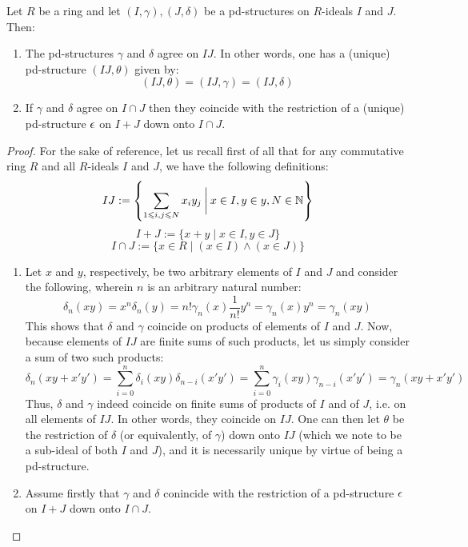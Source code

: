                 \begin{proposition}
                    Let $R$ be a ring and let $(I, \gamma), (J, \delta)$ be a pd-structures on $R$-ideals $I$ and $J$. Then:
                        \begin{enumerate}
                            \item The pd-structures $\gamma$ and $\delta$ agree on $IJ$. In other words, one has a (unique) pd-structure $(IJ, \theta)$ given by:
                                $$(IJ, \theta) = (IJ, \gamma) = (IJ, \delta)$$
                            \item If $\gamma$ and $\delta$ agree on $I \cap J$ then they coincide with the restriction of a (unique) pd-structure $\epsilon$ on $I + J$ down onto $I \cap J$.
                        \end{enumerate}
                \end{proposition}
                    \begin{proof}
                        For the sake of reference, let us recall first of all that for any commutative ring $R$ and all $R$-ideals $I$ and $J$, we have the following definitions:
                            $$IJ := \left\{\sum_{1 \leqslant i, j \leqslant N} x_iy_j \: \bigg| \: x \in I, y \in y, N \in \mathbb{N} \right\}$$
                            $$I + J := \{x + y \mid x \in I, y \in J\}$$
                            $$I \cap J := \{x \in R \mid (x \in I) \wedge (x \in J)\}$$
                        \begin{enumerate}
                            \item Let $x$ and $y$, respectively, be two arbitrary elements of $I$ and $J$ and consider the following, wherein $n$ is an arbitrary natural number:
                                $$\delta_n(xy) = x^n\delta_n(y) = n!\gamma_n(x) \frac{1}{n!}y^n = \gamma_n(x)y^n = \gamma_n(xy)$$
                            This shows that $\delta$ and $\gamma$ coincide on products of elements of $I$ and $J$. Now, because elements of $IJ$ are finite sums of such products, let us simply consider a sum of two such products:
                                $$\delta_n(xy + x'y') = \sum_{i = 0}^n \delta_i(xy)\delta_{n - i}(x'y') = \sum_{i = 0}^n \gamma_i(xy)\gamma_{n - i}(x'y') = \gamma_n(xy + x'y')$$
                            Thus, $\delta$ and $\gamma$ indeed coincide on finite sums of products of $I$ and of $J$, i.e. on all elements of $IJ$. In other words, they coincide on $IJ$. One can then let $\theta$ be the restriction of $\delta$ (or equivalently, of $\gamma$) down onto $IJ$ (which we note to be a sub-ideal of both $I$ and $J$), and it is necessarily unique by virtue of being a pd-structure.
                            \item Assume firstly that $\gamma$ and $\delta$ conincide with the restriction of a pd-structure $\epsilon$ on $I + J$ down onto $I \cap J$. 
                        \end{enumerate}
                    \end{proof}
                    
